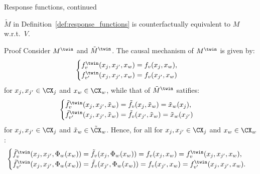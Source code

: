 \begin{frame}{Response functions, continued}
\begin{Prp}[\ref{prp:counterfactual_equivalence_response_functions}]
  $\tilde{M}$ in Definition~\ref{def:response_functions} is counterfactually equivalent to $M$ w.r.t.\ $V$.
\end{Prp}
\begin{block}{Proof}
\setlength\abovedisplayskip{5pt}
\setlength\belowdisplayskip{5pt}
%
%
  Consider $M^\twin$ and $\tilde{M}^\twin$.
  The causal mechanism of $M^\twin$ is given by:
  $$\begin{cases}
    f^\twin_v(x_j,x_{j'},x_w) = f_v(x_j,x_w), \\
    f^\twin_{v'}(x_j,x_{j'},x_w) = f_v(x_{j'},x_w)
  \end{cases}$$
  for $x_j, x_{j'} \in \CX_j$ and $x_w \in \CX_w$, while that of $\tilde{M}^\twin$ satifies:
  $$\begin{cases}
    \tilde{f}^\twin_v(x_j,x_{j'},\tilde{x}_w) = \tilde{f}_v(x_j,\tilde{x}_w) = \tilde{x}_w(x_j), \\
    \tilde{f}^\twin_{v'}(x_j,x_{j'},\tilde{x}_w) = \tilde{f}_v(x_{j'},\tilde{x}_w) = \tilde{x}_w(x_{j'})
  \end{cases}$$
  for $x_j, x_{j'} \in \CX_j$ and $\tilde{x}_w \in \tilde{\CX}_w$. 
  Hence, for all  for $x_j, x_{j'} \in \CX_j$ and $x_w \in \CX_w$:
  $$\begin{cases}
    \tilde{f}^\twin_v(x_j,x_{j'},\Phi_w(x_w)) = \tilde{f}_v(x_j,\Phi_w(x_w)) = f_v(x_j,x_w) = f^\twin_v(x_j,x_{j'},x_w), \\
    \tilde{f}^\twin_{v'}(x_j,x_{j'},\Phi_w(x_w)) = \tilde{f}_v(x_{j'},\Phi_w(x_w)) = f_v(x_{j'},x_w) = f^\twin_{v'}(x_j,x_{j'},x_w).
  \end{cases}$$
\end{block}
\end{frame}

